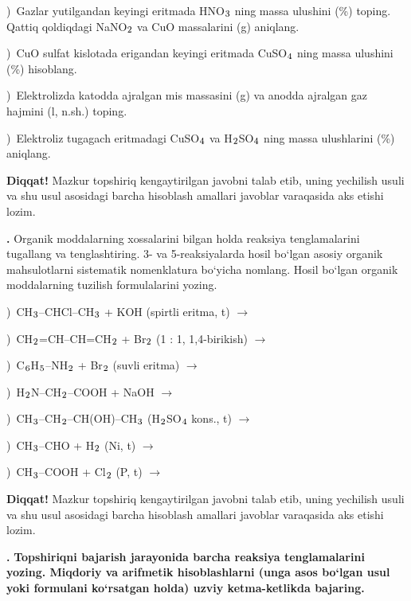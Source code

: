 \documentclass[11pt,a4paper]{article}
\renewcommand{\textsubscript}[1]{\ensuremath{_{\text{\fontsize{8}{8}\selectfont #1}}}}
\newcommand{\qn}[1]{\textbf{\fontsize{11.5}{13}\selectfont #1}}
\newcommand{\qsep}{\par\vspace{13pt}}
\newcommand{\diqqat}[1]{\par\smallskip\noindent\textbf{Diqqat!} #1\par\medskip}
\begin{document}
)\ Gazlar yutilgandan keyingi eritmada HNO\textsubscript{3} ning massa ulushini (\%) toping. Qattiq qoldiqdagi NaNO\textsubscript{2} va CuO massalarini (g) aniqlang.\par
{})\ CuO sulfat kislotada erigandan keyingi eritmada CuSO\textsubscript{4} ning massa ulushini (\%) hisoblang.\par
{})\ Elektrolizda katodda ajralgan mis massasini (g) va anodda ajralgan gaz hajmini (l, n.sh.) toping.\par
{})\ Elektroliz tugagach eritmadagi CuSO\textsubscript{4} va H\textsubscript{2}SO\textsubscript{4} ning massa ulushlarini (\%) aniqlang.\par
\diqqat{Mazkur topshiriq kengaytirilgan javobni talab etib, uning yechilish usuli va shu usul asosidagi barcha hisoblash amallari javoblar varaqasida aks etishi lozim.}\qsep
\noindent\qn{42.} Organik moddalarning xossalarini bilgan holda reaksiya tenglamalarini tugallang va tenglashtiring. 3- va 5-reaksiyalarda hosil bo`lgan asosiy organik mahsulotlarni sistematik nomenklatura bo`yicha nomlang. Hosil bo`lgan organik moddalarning tuzilish formulalarini yozing.\par
{})\ CH\textsubscript{3}--CHCl--CH\textsubscript{3} + KOH (spirtli eritma, t) $\to$\par
{})\ CH\textsubscript{2}=CH--CH=CH\textsubscript{2} + Br\textsubscript{2} (1 : 1, 1,4-birikish) $\to$\par
{})\ C\textsubscript{6}H\textsubscript{5}--NH\textsubscript{2} + Br\textsubscript{2} (suvli eritma) $\to$\par
{})\ H\textsubscript{2}N--CH\textsubscript{2}--COOH + NaOH $\to$\par
{})\ CH\textsubscript{3}--CH\textsubscript{2}--CH(OH)--CH\textsubscript{3} (H\textsubscript{2}SO\textsubscript{4} kons., t) $\to$\par
{})\ CH\textsubscript{3}--CHO + H\textsubscript{2} (Ni, t) $\to$\par
{})\ CH\textsubscript{3}--COOH + Cl\textsubscript{2} (P, t) $\to$\par
\diqqat{Mazkur topshiriq kengaytirilgan javobni talab etib, uning yechilish usuli va shu usul asosidagi barcha hisoblash amallari javoblar varaqasida aks etishi lozim.}\qsep
\noindent\qn{43.} \textbf{Topshiriqni bajarish jarayonida barcha reaksiya tenglamalarini yozing. Miqdoriy va arifmetik hisoblashlarni (unga asos bo`lgan usul yoki formulani ko`rsatgan holda) uzviy ketma-ketlikda bajaring.}\par\smallskip
\end{document}
